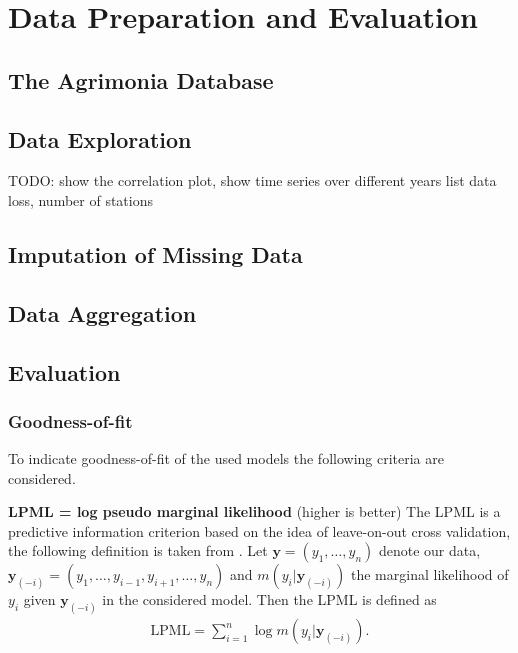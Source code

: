 \documentclass[12pt,a4paper]{article}
\begin{document}
\section{Data Preparation and Evaluation}


\subsection{The Agrimonia Database}

\subsection{Data Exploration}
TODO: show the correlation plot, show time series over different years
list data loss, number of stations

\subsection{Imputation of Missing Data}

\subsection{Data Aggregation}

\subsection{Evaluation}

\subsubsection{Goodness-of-fit}
To indicate goodness-of-fit of the used models the following criteria are considered.

\textbf{LPML = log pseudo marginal likelihood} (higher is better)
The LPML is a predictive information criterion based on the idea of leave-on-out cross validation, the following definition is taken from \cite{lecturenotes}. Let $\mathbf{y} = (y_1, \dots , y_n )$ denote our data, $\mathbf{y}_{(-i)} = (y_1, \dots , y_{i-1}, y_{i+1}, \dots, y_n )$ and $m(y_i | \mathbf{y}_{(-i)}) $ the marginal likelihood of $y_i$ given $\mathbf{y}_{(-i)}$ in the considered model. Then the LPML is defined as
\begin{align*}
    \text{LPML} = \sum_{i=1}^n \log m(y_i | \mathbf{y}_{(-i)}).
\end{align*}
    
\end{document}
